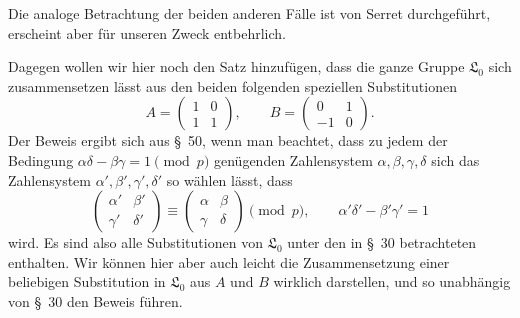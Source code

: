 \documentclass[11pt]{article}
\providecommand{\Lzero}{\mathfrak L_0}
\begin{document}
Die analoge Betrachtung der beiden anderen Fälle ist von Serret durchgeführt, erscheint aber für unseren Zweck entbehrlich.

Dagegen wollen wir hier noch den Satz hinzufügen, dass die ganze Gruppe $\Lzero$ sich zusammensetzen lässt aus den beiden folgenden speziellen Substitutionen
\begin{equation}
 A=\begin{pmatrix}1&0\\1&1\end{pmatrix},
 \qquad
 B=\begin{pmatrix}0&1\\-1&0\end{pmatrix}.
\tag{10}
\end{equation}
Der Beweis ergibt sich aus \S~50, wenn man beachtet, dass zu jedem der Bedingung $\alpha\delta-\beta\gamma=1\pmod p$ genügenden Zahlensystem $\alpha,\beta,\gamma,\delta$ sich das Zahlensystem $\alpha',\beta',\gamma',\delta'$ so wählen lässt, dass
\[
 \begin{pmatrix}\alpha'&\beta'\\\gamma'&\delta'\end{pmatrix}
 \equiv
 \begin{pmatrix}\alpha&\beta\\\gamma&\delta\end{pmatrix}
 \pmod p,
 \qquad
 \alpha'\delta'-\beta'\gamma'=1
\]
wird. Es sind also alle Substitutionen von $\Lzero$ unter den in \S~30 betrachteten enthalten. Wir können hier aber auch leicht die Zusammensetzung einer beliebigen Substitution in $\Lzero$ aus $A$ und $B$ wirklich darstellen, und so unabhängig von \S~30 den Beweis führen.
\end{document}
